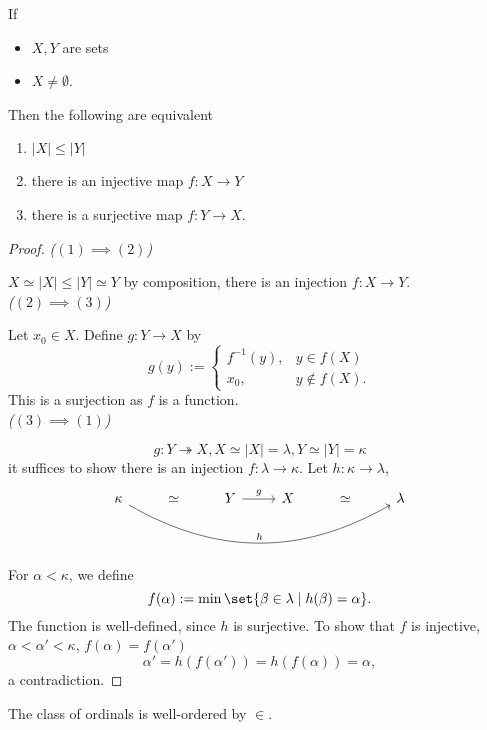 \begin{proposition}
    If \begin{itemize}
        \item $X, Y$ are sets
        \item $X \ne \emptyset$.
    \end{itemize}
    Then the following are equivalent
    \begin{enumerate}[label=(\arabic*)]
        \item $|X| \leq |Y|$
        \item there is an injective map $f: X \to Y$
        \item there is a surjective map $f: Y \to X$.
    \end{enumerate}
\end{proposition}
\begin{proof}
    \emph{($(1) \implies (2)$)} 
    
    $X \simeq |X| \leq |Y| \simeq Y$ by composition, there is an injection $f: X \to Y$.\\
    \emph{($(2) \implies (3)$)}

    Let $x_0 \in X$. Define $g: Y \to X$ by 
    $$ g(y) := \begin{cases}
        f^{-1}(y), & y \in f(X)\\
        x_0, & y \notin f(X).
    \end{cases}$$
    This is a surjection as $f$ is a function.\\
    \emph{($(3) \implies (1)$)}

    $$g: Y \twoheadrightarrow X, X \simeq |X| = \lambda, Y \simeq |Y| = \kappa$$
    it suffices to show there is an injection $f: \lambda \to \kappa$. 
    Let $h: \kappa \to \lambda$, 
    $$ \begin{tikzcd}
        \kappa \arrow[rrrrr, bend right, "h"] & \simeq & Y \arrow[r, "g"] & X &\simeq& \lambda
    \end{tikzcd}$$
    For $\alpha < \kappa$, we define 
    $$ f(\alpha) := \min \set{\beta \in \lambda \mid h(\beta) = \alpha}. $$
    The function is well-defined, since $h$ is surjective.
    To show that $f$ is injective, $\alpha < \alpha' < \kappa$, $f(\alpha) = f(\alpha')$
    $$ \alpha' = h(f(\alpha')) = h(f(\alpha)) = \alpha,$$
    a contradiction.
\end{proof}

\begin{exercise}
    The class of ordinals is well-ordered by $\in$.
\end{exercise}

